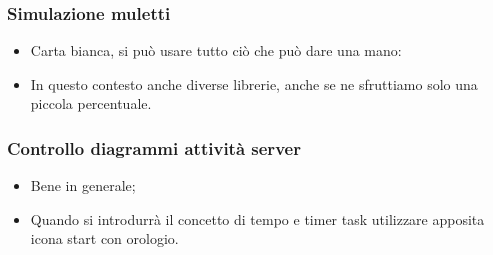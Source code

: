     \subsubsection{Simulazione muletti}
        \begin{itemize}
            \item Carta bianca, si può usare tutto ciò che può dare una mano:
            \item In questo contesto anche diverse librerie, anche se ne sfruttiamo solo  una piccola percentuale.
        \end{itemize}

    \subsubsection{Controllo diagrammi attività server}
        \begin{itemize}
            \item Bene in generale;
            \item Quando si introdurrà il concetto di tempo e timer task utilizzare apposita icona start con orologio.
        \end{itemize}

